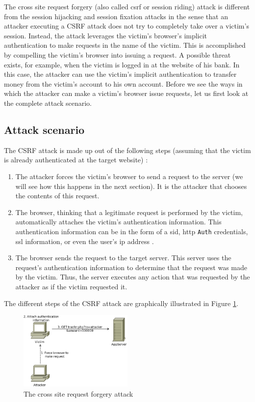 The cross site request forgery (also called \gls{csrf} or session riding) attack is different from the \gls{session hijacking} and \gls{session fixation} attacks in the sense that an attacker executing a CSRF attack does not try to completely take over a victim's session. Instead, the attack leverages the victim's browser's implicit authentication to make requests in the name of the victim. This is accomplished by compelling the victim's browser into issuing a request. A possible threat exists, for example, when the victim is logged in at the website of his bank. In this case, the attacker can use the victim's implicit authentication to transfer money from the victim's account to his own account. Before we see the ways in which the attacker can make a victim's browser issue requests, let us first look at the complete attack scenario.

\subsection{Attack scenario}

The CSRF attack is made up out of the following steps (assuming that the victim is already authenticated at the target website) \cite{Schreiber2004}:

\begin{enumerate}
	\item The attacker forces the victim's browser to send a request to the server (we will see how this happens in the next section). It is the attacker that chooses the contents of this request.
	\item The browser, thinking that a legitimate request is performed by the victim, automatically attaches the victim's authentication information. This authentication information can be in the form of a \gls{sid}, \gls{http} \texttt{Auth} credentials, \gls{ssl} information, or even the user's \gls{ip} address \cite{Johns2006b,Zeller2008}.
	\item The browser sends the request to the target server. This server uses the request's authentication information to determine that the request was made by the victim. Thus, the server executes any action that was requested by the attacker as if the victim requested it.
\end{enumerate}

The different steps of the CSRF attack are graphically illustrated in Figure \ref{fig:csrf}.

\begin{figure}[htb]
	\centering
	\includegraphics[width=0.50\textwidth]{img/csrf.png}
	\caption{The cross site request forgery attack}
	\label{fig:csrf}
\end{figure}

